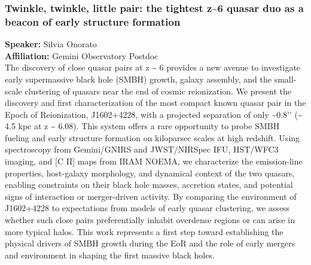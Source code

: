 \subsubsection*{Twinkle, twinkle, little pair: the tightest z\textasciitilde{}6 quasar duo as a beacon of early structure formation}
\textbf{Speaker:} Silvia Onorato \\
\textbf{Affiliation:} Gemini Observatory \textperiodcentered{} Postdoc\\
The discovery of close quasar pairs at z \textasciitilde{} 6 provides a new avenue to investigate early supermassive black hole (SMBH) growth, galaxy assembly, and the small-scale clustering of quasars near the end of cosmic reionization. We present the discovery and first characterization of the most compact known quasar pair in the Epoch of Reionization, J1602+4228, with a projected separation of only \textasciitilde{}0.8’’ (\textasciitilde{} 4.5 kpc at z \textasciitilde{} 6.08). This system offers a rare opportunity to probe SMBH fueling and early structure formation on kiloparsec scales at high redshift. Using spectroscopy from Gemini/GNIRS and JWST/NIRSpec IFU, HST/WFC3 imaging, and [C II] maps from IRAM NOEMA, we characterize the emission-line properties, host-galaxy morphology, and dynamical context of the two quasars, enabling constraints on their black hole masses, accretion states, and potential signs of interaction or merger-driven activity. By comparing the environment of J1602+4228 to expectations from models of early quasar clustering, we assess whether such close pairs preferentially inhabit overdense regions or can arise in more typical halos. This work represents a first step toward establishing the physical drivers of SMBH growth during the EoR and the role of early mergers and environment in shaping the first massive black holes.

\hypertarget{abs-63}{}
